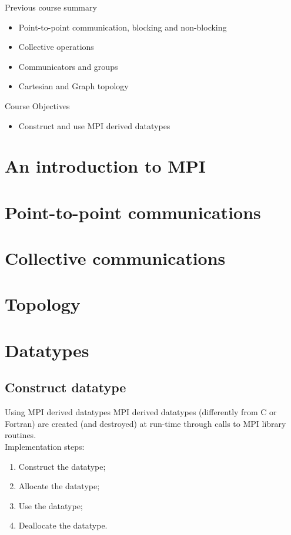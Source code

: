 \documentclass[aspectratio=43]{beamer}
\begin{document}
\cscstitle

\begin{frame}{Previous course summary}
\begin{itemize}
\item Point-to-point communication, blocking and non-blocking
\item Collective operations
\item Communicators and groups
\item Cartesian and Graph topology
\end{itemize}
\end{frame}

\begin{frame}{Course Objectives}
\begin{itemize}
\item Construct and use MPI derived datatypes
\end{itemize}
\end{frame}


\section{An introduction to MPI}
\section{Point-to-point communications}
\section{Collective communications}
\section{Topology}
\section{Datatypes}


\subsection{Construct datatype}

\begin{frame}[fragile]{Using MPI derived datatypes}
MPI derived datatypes (differently from C or Fortran) are created (and destroyed) at run-time through calls to MPI library routines.\\
Implementation steps:
\begin{enumerate}
\item Construct the datatype;
\item Allocate the datatype;
\item Use the datatype;
\item Deallocate the datatype.
\end{enumerate}
\end{frame}
\end{document}
